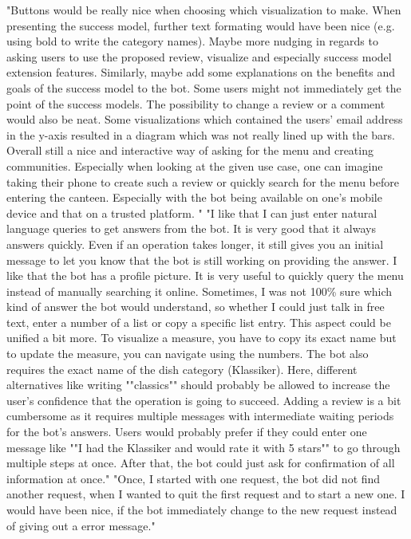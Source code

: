 \begin{appendices}
"Buttons would be really nice when choosing which visualization to make. 
When presenting the success model, further text formating would have been nice (e.g. using bold to write the category names).
Maybe more nudging in regards to asking users to use the proposed review, visualize and especially success model extension features. Similarly, maybe add some explanations on the benefits and goals of the success model to the bot. Some users might not immediately get the point of the success models. 
The possibility to change a review or a comment would also be neat. 
Some visualizations which contained the users' email address in the y-axis resulted in a diagram which was not really lined up with the bars.
Overall still a nice and interactive way of asking for the menu and creating communities. Especially when looking at the given use case, one can imagine taking their phone to create such a review or quickly search for the menu before entering the canteen. Especially with the bot being available on one's mobile device and that on a trusted platform. "
\bigbreak
"I like that I can just enter natural language queries to get answers from the bot. It is very good that it always answers quickly. Even if an operation takes longer, it still gives you an initial message to let you know that the bot is still working on providing the answer. I like that the bot has a profile picture. It is very useful to quickly query the menu instead of manually searching it online.
Sometimes, I was not 100\% sure which kind of answer the bot would understand, so whether I could just talk in free text, enter a number of a list or copy a specific list entry. This aspect could be unified a bit more. To visualize a measure, you have to copy its exact name but to update the measure, you can navigate using the numbers. The bot also requires the exact name of the dish category (Klassiker). Here, different alternatives like writing ""classics"" should probably be allowed to increase the user's confidence that the operation is going to succeed.
Adding a review is a bit cumbersome as it requires multiple messages with intermediate waiting periods for the bot's answers. Users would probably prefer if they could enter one message like ""I had the Klassiker and would rate it with 5 stars"" to go through multiple steps at once. After that, the bot could just ask for confirmation of all information at once."
\bigbreak
"Once, I started with one request, the bot did not find another request, when I wanted to quit the first request and to start a new one. I would have been nice, if the bot immediately change to the new request instead of giving out a error message."

\end{appendices}
